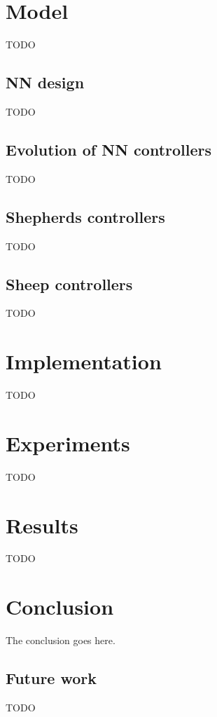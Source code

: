 \documentclass[conference]{IEEEtran}
\begin{document}
\section{Model}
TODO

\subsection{NN design}
TODO

\subsection{Evolution of NN controllers}
TODO

\subsection{Shepherds controllers}
TODO

\subsection{Sheep controllers}
TODO

\section{Implementation}
TODO

\section{Experiments}
TODO

\section{Results}
TODO

\section{Conclusion}
The conclusion goes here.

\subsection{Future work}
TODO





\end{document}
